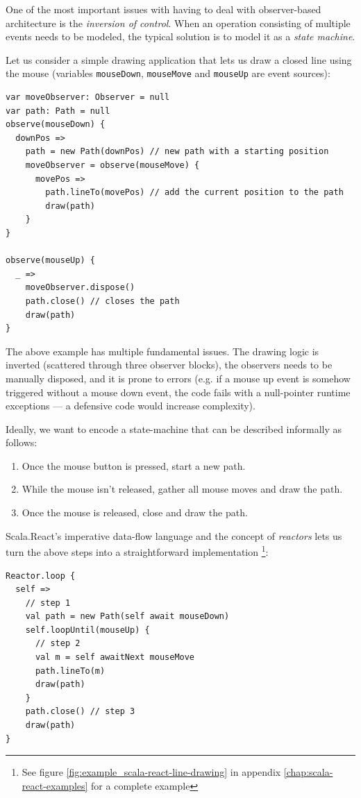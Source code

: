 One of the most important issues with having to deal with observer-based architecture is the \emph{inversion of control}. When an operation consisting of multiple events needs to be modeled, the typical solution is to model it as a \emph{state machine}. 

Let us consider a simple drawing application that lets us draw a closed line using the mouse (variables \texttt{mouseDown}, \texttt{mouseMove} and \texttt{mouseUp} are event sources):

\begin{lstlisting}
var moveObserver: Observer = null
var path: Path = null
observe(mouseDown) {
  downPos => 
    path = new Path(downPos) // new path with a starting position
    moveObserver = observe(mouseMove) {
      movePos =>
        path.lineTo(movePos) // add the current position to the path
        draw(path)
    }
}

observe(mouseUp) {
  _ =>
    moveObserver.dispose()
    path.close() // closes the path
    draw(path)
}
\end{lstlisting}

The above example has multiple fundamental issues. The drawing logic is inverted (scattered through three observer blocks), the observers needs to be manually disposed, and it is prone to errors (e.g. if a mouse up event is somehow triggered without a mouse down event, the code fails with a null-pointer runtime exceptions --- a defensive code would increase complexity).

Ideally, we want to encode a state-machine that can be described informally as follows:
\begin{enumerate}
\item Once the mouse button is pressed, start a new path.
\item While the mouse isn't released, gather all mouse moves and draw the path.
\item Once the mouse is released, close and draw the path.
\end{enumerate}

Scala.React's imperative data-flow language and the concept of \emph{reactors} lets us turn the above steps into a straightforward implementation \footnote{See figure \ref{fig:example_scala-react-line-drawing} in appendix \ref{chap:scala-react-examples} for a complete example}:

\begin{lstlisting}
Reactor.loop {
  self =>
    // step 1
    val path = new Path(self await mouseDown)
    self.loopUntil(mouseUp) {
      // step 2
      val m = self awaitNext mouseMove
      path.lineTo(m)
      draw(path)
    }
    path.close() // step 3
    draw(path)
}
\end{lstlisting}

